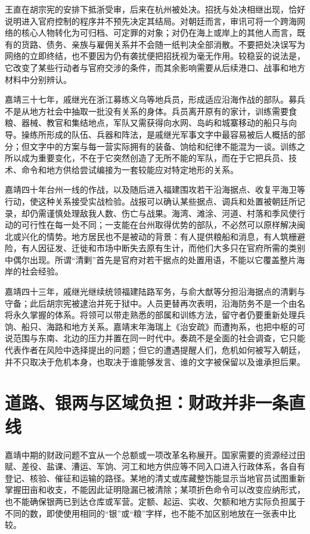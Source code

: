 王直在胡宗宪的安排下抵浙受审，后来在杭州被处决。招抚与处决相继出现，恰好说明进入官府控制的程序并不预先决定其结局。对朝廷而言，审讯可将一个跨海网络的核心人物转化为可归档、可定罪的对象；对仍在海上或岸上的其他人而言，既有的货路、债务、亲族与雇佣关系并不会随一纸判决全部消散。不要把处决误写为网络的立即终结，也不要因为仍有袭扰便把招抚视为毫无作用。较稳妥的说法是，它改变了某些行动者与官府交涉的条件，而其余影响需要从后续港口、战事和地方材料中分别辨认。

嘉靖三十七年，戚继光在浙江募练义乌等地兵员，形成适应沿海作战的部队。募兵不是从地方社会中抽取一批没有关系的身体。兵员离开原有的家计，训练需要食粮、器械、教官和集结地点，军队又需获得向水网、岛屿和城寨移动的船只与向导。操练所形成的队伍、兵器和阵法，是戚继光军事文字中最容易被后人概括的部分；但文字中的方案与每一营实际拥有的装备、饷给和纪律不能混为一谈。训练之所以成为重要变化，不在于它突然创造了无所不能的军队，而在于它把兵员、技术、命令和地方供给尝试编接为一套较能应对特定地形的关系。

嘉靖四十年台州一线的作战，以及随后进入福建围攻若干沿海据点、收复平海卫等行动，使这种关系接受实战检验。战报可以确认某些据点、调兵和处置被朝廷所记录，却仍需谨慎处理敌我人数、伤亡与战果。海湾、滩涂、河道、村落和季风使行动的可行性在每一处不同；一支能在台州取得优势的部队，不必然可以原样解决闽北或兴化的情势。地方居民也不是被动的背景：有人提供粮船和消息，有人筑栅避险，有人因征发、迁徙和市场中断失去原有生计，而他们大多只在官府所需的类别中偶尔出现。所谓“清剿”首先是官府对若干据点的处置用语，不能以它覆盖整片海岸的社会经验。

嘉靖四十三年，戚继光继续统领福建陆路军务，与俞大猷等分担沿海据点的清剿与守备；此后胡宗宪被逮治并死于狱中。人员更替再次表明，沿海防务不是一个由名将永久掌握的体系。将领可以带走熟悉的部属和训练方法，留守者仍要重新处理兵饷、船只、海路和地方关系。嘉靖末年海瑞上《治安疏》而遭拘系，也把中枢的可说范围与东南、北边的压力并置在同一时代中。奏疏不是全面的社会调查，它只能代表作者在风险中选择提出的问题；但它的遭遇提醒人们，危机如何被写入朝廷，并不只取决于危机本身，也取决于谁能够发言、谁的文字被保留以及谁承担后果。

\section{道路、银两与区域负担：财政并非一条直线}

嘉靖中期的财政问题不宜从一个总额或一项改革名称展开。国家需要的资源经过田赋、差役、盐课、漕运、军饷、河工和地方供应等不同入口进入行政体系，各自有登记、核验、催征和运输的路径。某地的清丈或库藏整饬能显示当地官员试图重新掌握田亩和收支，不能因此证明隐漏已被清除；某项折色命令可以改变应纳形式，也不能确保银两已到达仓库或军营。定额、起运、实收、欠额和地方实际负担属于不同的数，即使使用相同的“银”或“粮”字样，也不能不加区别地放在一张表中比较。

